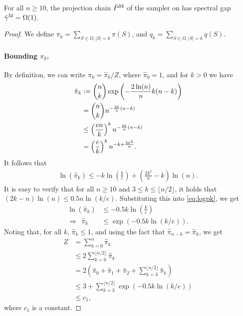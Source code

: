 \setcounter{lemma}{0}
\begin{lemma}
  For all $n \geq 10$, the projection chain $\bar{P}^{\mathrm{M}}$ of the \Ms{} sampler on \ising{} has spectral gap $\bar{\gamma}^{\mathrm{M}} = \Omega(1)$.
\end{lemma}

\begin{proof}
We define $\pi_k = \sum_{S \in \Omega, |S| = k} \pi(S)$, and $q_k = \sum_{S \in \Omega, |S| = k} q(S)$.

\paragraph{Bounding $\pi_k$.}
By definition, we can write $\pi_k = \hat{\pi}_k / Z$, where $\hat{\pi}_0 = 1$, and for $k > 0$ we have
\begin{align*}
\hat{\pi}_k &\vcentcolon= \binom{n}{k} \exp\left(-\frac{2\ln(n)}{n} k(n-k)\right)\\
            &= \binom{n}{k} n^{-\frac{2k}{n} (n-k)}\\
            &\leq \left(\frac{en}{k}\right)^k n^{-\frac{2k}{n} (n-k)}\\
            &= \left(\frac{e}{k}\right)^k n^{-k + \frac{2k^2}{n}}.
\end{align*}
It follows that
\begin{align} \label{eq:logpk}
  \ln(\hat{\pi}_k) \leq -k \ln\left(\frac{k}{e}\right) + \left(\frac{2k^2}{n} - k\right)\ln(n).
\end{align}
It is easy to verify that for all $n \geq 10$ and $3 \leq k \leq \lfloor n/2 \rfloor$, it holds that $(2k-n)\ln(n) \leq 0.5n\ln(k/e)$.
Substituting this into \eqref{eq:logpk}, we get
\begin{align*}
            \ln(\hat{\pi}_k) &\leq -0.5k\ln\left(\frac{k}{e}\right)\\
  \Rightarrow\ \ \hat{\pi}_k &\leq \exp(-0.5k\ln(k/e)).
\end{align*}
Noting that, for all $k$, $\hat{\pi}_k \leq 1$, and using the fact that $\hat{\pi}_{n-k} = \hat{\pi}_k$, we get
\begin{align}
  Z &= \sum_{k = 0}^n \hat{\pi}_k \nonumber\\ 
    &\leq 2\sum_{k = 0}^{\lfloor n/2 \rfloor} \hat{\pi}_ k\nonumber\\
    &= 2(\hat{\pi}_0 + \hat{\pi}_1 + \hat{\pi}_2 + \sum_{k = 3}^{\lfloor n/2 \rfloor} \hat{\pi}_k) \nonumber\\
    &\leq 3 + \sum_{k = 3}^{\lfloor n/2 \rfloor} \exp(-0.5k\ln(k/e)) \nonumber\\
    &\leq c_1, \label{eq:Zconst}
\end{align}
where $c_1$ is a constant.


\end{proof}
